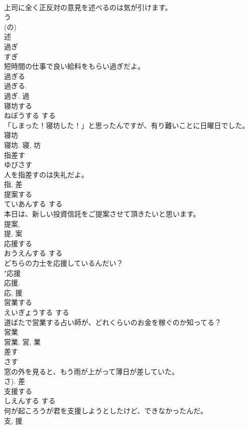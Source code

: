 \documentclass[8pt]{extreport}
\begin{document}
\begin{CJK}{UTF8}{min}
\\	上司に全く正反対の意見を述べるのは気が引けます。	
\\	う 
\\	(の) 
\\	述	
\\	過ぎ	
\\	すぎ	
\\	短時間の仕事で良い給料をもらい過ぎだよ。	
\\	過ぎる 
\\	過ぎる. 
\\	過ぎ.	過	
\\	寝坊する	
\\	ねぼうする	する 
\\	「しまった！寝坊した！」と思ったんですが、有り難いことに日曜日でした。	
\\	寝坊 
\\	寝坊.	寝, 坊	
\\	指差す	
\\	ゆびさす	
\\	人を指差すのは失礼だよ。	
\\	指, 差	
\\	提案する	
\\	ていあんする	する 
\\	本日は、新しい投資信託をご提案させて頂きたいと思います。	
\\	提案, 
\\	提, 案	
\\	応援する	
\\	おうえんする	する 
\\	どちらの力士を応援しているんだい？	
\\	"応援 
\\	応援. 
\\	応, 援	
\\	営業する	
\\	えいぎょうする	する 
\\	道ばたで営業する占い師が、どれくらいのお金を稼ぐのか知ってる？	
\\	営業 
\\	営業.	営, 業	
\\	差す	
\\	さす	
\\	窓の外を見ると、もう雨が上がって薄日が差していた。	
\\	さ).	差	
\\	支援する	
\\	しえんする	する 
\\	何が起ころうが君を支援しようとしたけど、できなかったんだ。	
\\	支, 援	

\end{CJK}
\end{document}

